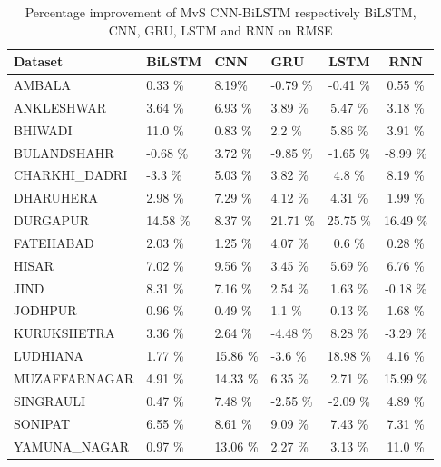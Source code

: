 \documentclass[a4paper, fleqn]{cas-sc}
\theoremstyle{definition}
\theoremstyle{remark}
\begin{document}
  \begin{table}[]
    \caption{Percentage improvement of MvS CNN-BiLSTM respectively BiLSTM,  CNN,  GRU,  LSTM and RNN on RMSE}
    \label{RMSE imp}
    \begin{tabular}{llllcc}
    \hline    Dataset        &   BiLSTM &   CNN &   GRU &   LSTM &   RNN \\ \hline
    AMBALA         & 0.33 \%           & 8.19\%         & -0.79 \%       & -0.41 \%         & 0.55 \%            \\
    ANKLESHWAR     & 3.64  \%            & 6.93 \%        & 3.89 \%        & 5.47 \%         & 3.18 \%              \\
    BHIWADI       & 11.0  \%            & 0.83 \%         & 2.2 \%         & 5.86  \%        & 3.91 \%            \\
    BULANDSHAHR    & -0.68  \%            & 3.72 \%         & -9.85 \%       & -1.65  \%       & -8.99 \%               \\
    CHARKHI\_DADRI & -3.3 \%            & 5.03 \%        & 3.82 \%        & 4.8   \%        & 8.19   \%              \\
    DHARUHERA      & 2.98 \%            & 7.29 \%        & 4.12 \%        & 4.31 \%         & 1.99     \%             \\
    DURGAPUR       & 14.58 \%          & 8.37 \%         & 21.71 \%       & 25.75  \%       & 16.49  \%                \\
    FATEHABAD    & 2.03 \%           & 1.25 \%        & 4.07 \%        & 0.6    \%       & 0.28  \%                   \\
    HISAR          & 7.02 \%           & 9.56 \%        & 3.45 \%        & 5.69  \%        & 6.76  \%                   \\
    JIND           & 8.31 \%           & 7.16 \%        & 2.54 \%        & 1.63 \%         & -0.18 \%                    \\
    JODHPUR        & 0.96 \%           & 0.49 \%         & 1.1 \%         & 0.13 \%          & 1.68 \%                     \\
    KURUKSHETRA    & 3.36 \%           & 2.64 \%        & -4.48  \%      & 8.28 \%         & -3.29  \%                 \\
    LUDHIANA      & 1.77 \%           & 15.86 \%       & -3.6  \%       & 18.98 \%      & 4.16   \%                  \\
    MUZAFFARNAGAR  & 4.91 \%           & 14.33 \%       & 6.35 \%         & 2.71 \%         & 15.99 \%                    \\
    SINGRAULI      & 0.47 \%           & 7.48 \%        & -2.55 \%       & -2.09 \%        & 4.89  \%                   \\
    SONIPAT        & 6.55 \%           & 8.61 \%        & 9.09 \%        & 7.43 \%         & 7.31  \%                    \\
    YAMUNA\_NAGAR  & 0.97 \%           & 13.06 \%       & 2.27 \%        & 3.13 \%         & 11.0  \%                   \\ \hline
    \end{tabular}
    \end{table}
\end{document}
